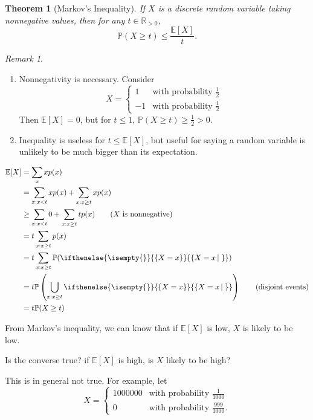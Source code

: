 \documentclass[a4paper,11pt]{amsbook}
\makeatletter
\renewenvironment{proof}[1][\proofname]{\par
    \pushQED{\qed}%
    \normalfont \topsep6\p@\@plus6\p@\relax
    \trivlist
    \itemindent\z@ %
    \item[\hskip\labelsep
          \scshape
      #1\@addpunct{.}]\ignorespaces
}{%
    \popQED\endtrivlist\@endpefalse
}
\newtheorem{theorem}{\hspace{-2em} \color{darkblue} Theorem}[chapter]
\theoremstyle{definition}
\theoremstyle{remark}
\newtheorem{remark}{\hspace{-2em} \color{darkblue} Remark}[chapter]
\newcommand{\R}{\mathbb{R}}
\newcommand{\E}{\mathbb{E}}
\renewcommand{\P}{\mathbb{P}}
\newcommand\0{\varnothing}
\newcommand\set[2][]
{
    \ifthenelse{\isempty{#1}}
    {
        \left\{#2\right\}
    }
    {
        \left\{#2\left|\,#1\right.\right\}
    }
}
\makeatother
\begin{document}
    \begin{theorem}[Markov's Inequality]{}
        If $X$ is a discrete random variable taking nonnegative values, then for any $t\in\R_{>0}$,
        $$\P(X\geq t)\leq\frac{\E[X]}{t}.$$
    \end{theorem}
    \begin{remark} \begin{enumerate}
        \item Nonnegativity is necessary. Consider $$X=\begin{cases}
            1 & \text{with probability }\frac12 \\[10pt]
            -1 & \text{with probability }\frac12
        \end{cases}$$
        Then $\E[X]=0$, but for $t\leq1$, $\P(X\geq t)\geq\frac12>0$.
        \item Inequality is useless for $t\leq\E[X]$, 
        but useful for saying a random variable is unlikely to be much bigger than its expectation.
    \end{enumerate} \end{remark}
    \begin{proof}
        \begin{align*}
            \E[X]&=\sum_{x}xp(x) \\
            &=\sum_{x:x<t}xp(x)+\sum_{x:x\geq t}xp(x) \\
            &\geq\sum_{x:x<t}0+\sum_{x:x\geq t}tp(x) \tag{$X$ is nonnegative} \\
            &=t\sum_{x:x\geq t}p(x) \\
            &=t\sum_{x:x\geq t}\P(\set{X=x}) \\
            &=t\P\left(\bigcup_{x:x\geq t}\set{X=x}\right) \tag{disjoint events} \\
            &=t\P(X\geq t)
        \end{align*}
    \end{proof}

    From Markov's inequality, we can know that if $\E[X]$ is low, $X$ is likely to be low.

    Is the converse true? if $\E[X]$ is high, is $X$ likely to be high?

    This is in general not true. For example, let
    $$X=\begin{cases}
        1000000 & \text{with probability }\frac{1}{1000} \\[10pt]
        0 & \text{with probability }\frac{999}{1000}.
    \end{cases}$$
\end{document}
